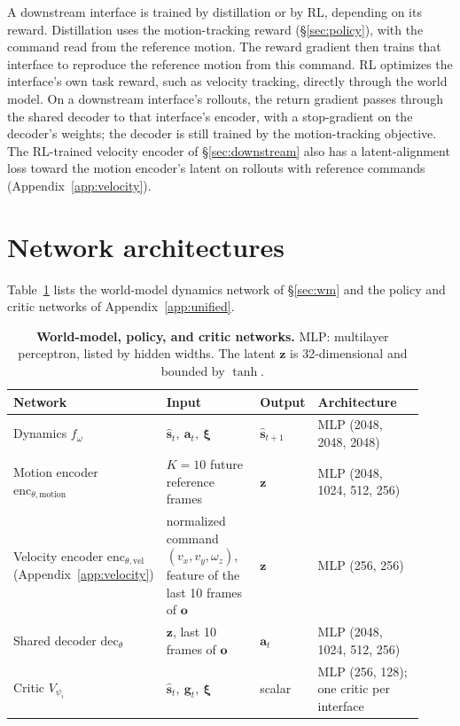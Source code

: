 A downstream interface is trained by distillation or by RL, depending on its reward. Distillation uses the motion-tracking reward (\S\ref{sec:policy}), with the command read from the reference motion. The reward gradient then trains that interface to reproduce the reference motion from this command. RL optimizes the interface's own task reward, such as velocity tracking, directly through the world model. On a downstream interface's rollouts, the return gradient passes through the shared decoder to that interface's encoder, with a stop-gradient on the decoder's weights; the decoder is still trained by the motion-tracking objective. The RL-trained velocity encoder of \S\ref{sec:downstream} also has a latent-alignment loss toward the motion encoder's latent on rollouts with reference commands (Appendix~\ref{app:velocity}).

\section{Network architectures}

Table~\ref{tab:policy-nets} lists the world-model dynamics network of \S\ref{sec:wm} and the policy and critic networks of Appendix~\ref{app:unified}.

\begin{table}[t]
\centering
\footnotesize
\setlength{\tabcolsep}{3pt}
\begin{tabular}{@{}>{\raggedright\arraybackslash}p{0.24\linewidth}>{\raggedright\arraybackslash}p{0.28\linewidth}>{\raggedright\arraybackslash}p{0.08\linewidth}>{\raggedright\arraybackslash}p{0.32\linewidth}@{}}
\toprule
\textbf{Network} & \textbf{Input} & \textbf{Output} & \textbf{Architecture} \\
\midrule
Dynamics $f_\omega$ & $\hat{\bm{s}}_t,\ \bm{a}_t,\ \bm{\xi}$ & $\hat{\bm{s}}_{t+1}$ & MLP (2048, 2048, 2048) \\
\midrule
Motion encoder $\mathrm{enc}_{\theta,\text{motion}}$ & $K{=}10$ future reference frames & $\bm{z}$ & MLP (2048, 1024, 512, 256) \\
Velocity encoder $\mathrm{enc}_{\theta,\text{vel}}$ (Appendix~\ref{app:velocity}) & normalized command $(v_x, v_y, \omega_z)$, feature of the last 10 frames of $\bm{o}$ & $\bm{z}$ & MLP (256, 256) \\
Shared decoder $\mathrm{dec}_\theta$ & $\bm{z}$, last 10 frames of $\bm{o}$ & $\bm{a}_t$ & MLP (2048, 1024, 512, 256) \\
Critic $V_{\psi_i}$ & $\hat{\bm{s}}_t,\ \bm{g}_t,\ \bm{\xi}$ & scalar & MLP (256, 128); one critic per interface \\
\bottomrule
\end{tabular}
\vspace{0.6em}
\caption{\textbf{World-model, policy, and critic networks.} MLP: multilayer perceptron, listed by hidden widths. The latent $\bm{z}$ is 32-dimensional and bounded by $\tanh$.}
\label{tab:policy-nets}
\end{table}

